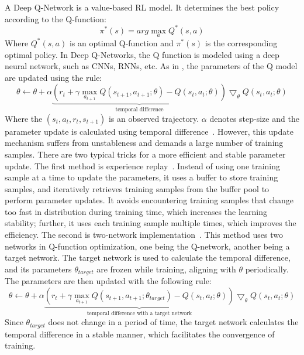 A Deep Q-Network is a value-based RL model. It determines the best policy according to the Q-function: 
\begin{equation}
\pi^{*}(s) = arg\max_{a}Q^{*}(s, a)
\end{equation}
Where $Q^{*}(s, a)$ is an optimal Q-function and $\pi^{*}(s)$ is the corresponding optimal policy. In Deep Q-Networks, the Q function is modeled using a deep neural network, such as CNNs, RNNs, etc. 
As in , the parameters of the Q model are updated using the rule: 
\begin{equation}
\theta \leftarrow \theta + \alpha \underbrace{\left (r_t+\gamma\max_{a_{t+1}}Q(s_{t+1}, a_{t+1}; \theta) - Q(s_t, a_t; \theta) \right )}_\text{temporal\ difference} \bigtriangledown_{\theta}Q(s_t, a_t; \theta)
\end{equation}
Where the $(s_t, a_t, r_t, s_{t+1})$ is an observed trajectory. $\alpha$ denotes step-size and the parameter update is calculated using temporal difference~. However, this update mechanism suffers from unstableness and demands a large number of training samples. There are two typical tricks for a more efficient and stable parameter update.
The first method is experience replay~. Instead of using one training sample at a time to update the parameters, it uses a buffer to store training samples, and iteratively retrieves training samples from the buffer pool to perform parameter updates. It avoids encountering training samples that change too fast in distribution during training time, which increases the learning stability; further, it uses each training sample multiple times, which improves the efficiency. 
The second is two-network implementation~. This method uses two networks in Q-function optimization, one being the Q-network, another being a target network. The target network is used to calculate the temporal difference, and its parameters $\theta_{target}$ are frozen while training, aligning with $\theta$ periodically. The parameters are then updated with the following rule: 
\begin{equation}
\theta \leftarrow \theta + \alpha \underbrace{\left (r_t+\gamma\max_{a_{t+1}}Q(s_{t+1}, a_{t+1}; \theta_{target}) - Q(s_t, a_t; \theta) \right )}_\text{temporal\ difference\ with\ a\ target\ network} \bigtriangledown_{\theta}Q(s_t, a_t; \theta)
\end{equation}
Since $\theta_{target}$ does not change in a period of time, the target network calculates the temporal difference in a stable manner, which facilitates the convergence of training.

